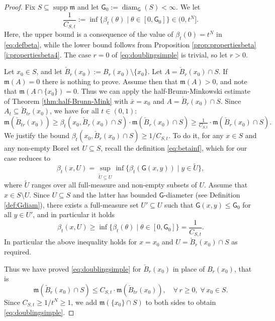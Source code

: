 \documentclass[11pt,a4paper]{article}
\theoremstyle{plain}
\theoremstyle{definition}
\theoremstyle{remark}
\numberwithin{equation}{section}
\DeclareMathOperator{\supp}{\mathrm{supp}}
\DeclareMathOperator{\diam}{\mathrm{diam}}
\newcommand{\mm}{\mathfrak m}
\newcommand{\sfG}{\mathsf G}
\begin{document}
\begin{proof}
Fix $S\subseteq \supp\mm$ and let $\sfG_0:=\diam_{\sfG}(S) <\infty$. We let
\begin{equation}
\frac{1}{C_{S,t}}:=\inf\{\beta_{t}(\theta)\mid \theta \in [0,\sfG_0]\} \in (0,t^N].
\end{equation}
Here, the upper bound is a consequence of the value of $\beta_t(0)=t^N$ in \eqref{eq:defbeta}, while the lower bound follows from Proposition \ref{prop:propertiesbeta}\ref{i:propertiesbeta4}. The case $r=0$ of \eqref{eq:doublingsimple} is trivial, so let $r>0$. 

Let  $x_0\in  S$, and let $\check{B}_r(x_0) := B_r(x_0)\setminus \{x_0\}$. Let $A=\check{B}_{r}(x_0)\cap S$. If $\mm(A)=0$ there is nothing to prove. Assume then that $\mm(A)>0$, and note that $\mm(A \cap \{x_0\})=0$. Thus we can apply the half-Brunn-Minkowski estimate of Theorem \ref{thm:half-Brunn-Mink} with $\bar{x}=x_0$ and $A=\check{B}_{r}(x_0)\cap S$. Since $A_t\subseteq \check{B}_{tr}(x_0)$, we have for all $t\in(0,1)$:
\begin{equation}
\mm(\check{B}_{tr}(x_0)) \geq \beta_t(x_0,\check{B}_{r}(x_0)\cap S  ) \cdot \mm(\check{B}_{r}(x_0)\cap S) 
\geq \tfrac{1}{C_{S,t}} \cdot \mm(\check{B}_{r}(x_0)\cap S).
\end{equation}
We justify the bound $\beta_t(x_0,\check{B}_{r}(x_0)\cap S )\geq 1/C_{S,t}$. To do it, for any $x\in S$ and any non-empty Borel set $U\subseteq S$, recall the definition \eqref{eq:betainf}, which for our case reduces to
\begin{equation}
\beta_t(x,U) = \sup_{\tilde{U}\subseteq U} \inf \{\beta_t(\sfG(x,y))\mid y\in \tilde{U}\},
\end{equation}
where $\tilde{U}$ ranges over all full-measure and non-empty  subsets of $U$. Assume that $x\in S\setminus U$. Since $U\subseteq S$ and the latter has bounded $\sfG$-diameter (see Definition \ref{def:Gdiam}), there exists a full-measure set $U'\subseteq U$ such that $\sfG(x,y) \leq \sfG_0$ for all $y \in U'$, and in particular it holds
\begin{equation}
\beta_t(x,U) \geq \inf \{\beta_t(\theta)\mid \theta \in [0,\sfG_0]\}  = \frac{1}{C_{S,t}}.
\end{equation}
In particular the above inequality holds for $x=x_0$ and $U=\check{B}_r(x_0) \cap S$  as required.

Thus we have proved \eqref{eq:doublingsimple} for $\check{B}_r(x_0)$ in place of $B_r(x_0)$, that is
\begin{equation}
\mm(\check{B}_{r}(x_0)\cap S)\leq C_{S,t}\cdot \mm(\check{B}_{tr}(x_0)),\quad \forall\, r\geq 0,\; \forall\, x_0\in S.
\end{equation}
Since $C_{S,t}\geq 1/t^N \geq 1$, we add $\mm(\{x_0\}\cap S)$ to both sides to obtain \eqref{eq:doublingsimple}.
\end{proof}
\end{document}
